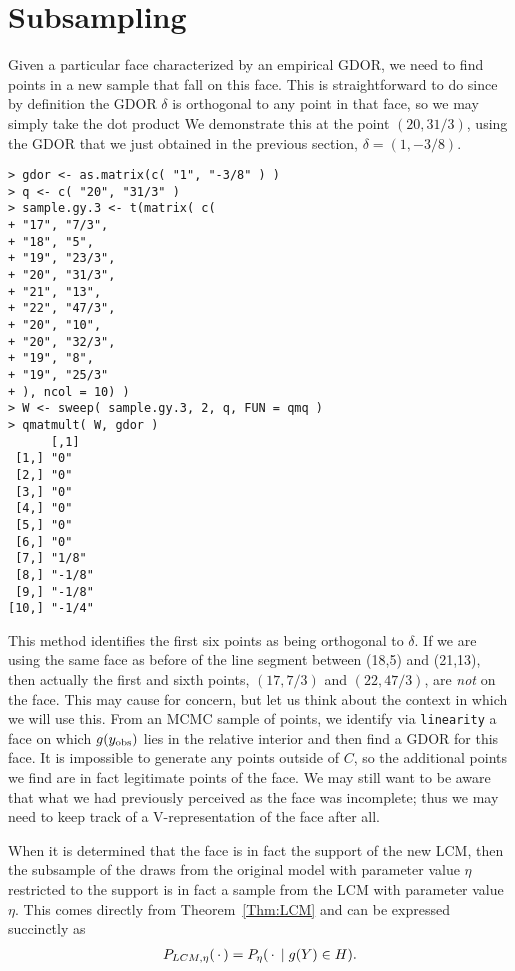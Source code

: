 \section{Subsampling}
Given a particular face characterized by an empirical GDOR, we need to
find points in a new sample that fall on this face.  This is straightforward to
do since by definition the GDOR $\delta$ is orthogonal to any point in that face,
so we may simply take the dot product 
We demonstrate this at the point $(20, 31/3)$, using the GDOR that we just 
obtained in the previous section, $\delta = (1, -3/8)$.
\begin{verbatim}
> gdor <- as.matrix(c( "1", "-3/8" ) )
> q <- c( "20", "31/3" )
> sample.gy.3 <- t(matrix( c(
+ "17", "7/3",
+ "18", "5",
+ "19", "23/3",
+ "20", "31/3",
+ "21", "13",
+ "22", "47/3",
+ "20", "10",
+ "20", "32/3",
+ "19", "8",
+ "19", "25/3"
+ ), ncol = 10) )
> W <- sweep( sample.gy.3, 2, q, FUN = qmq )
> qmatmult( W, gdor )
      [,1]  
 [1,] "0"   
 [2,] "0"   
 [3,] "0"   
 [4,] "0"   
 [5,] "0"   
 [6,] "0"   
 [7,] "1/8" 
 [8,] "-1/8"
 [9,] "-1/8"
[10,] "-1/4"
\end{verbatim}
This method identifies the first six points as being orthogonal to $\delta$.
If we are using the same face as before of the line segment between (18,5) and (21,13), 
then actually the first and sixth points, $(17, 7/3)$ and $(22,47/3)$, 
are \emph{not} on the face.  This may cause for concern, but let us 
think about the context in which we will use this.  From an MCMC sample of points,
we identify via \texttt{linearity} a face on which $g(y_{\text{obs}})$ lies in the relative
interior and then find a GDOR for this face.  It is impossible to generate any
points outside of $C$, so the additional points we find are in fact legitimate 
points of the face.  We may still want to be aware that what we had previously
perceived as the face was incomplete; thus we may need to keep track of a 
V-representation of the face after all.

When it is determined that the face is in fact the support of the new LCM,
then the subsample of the draws from the original model with parameter value $\eta$ 
restricted to the support is in fact a sample from the LCM with 
parameter value $\eta$.  This comes directly from Theorem~\ref{Thm:LCM} and can be
expressed succinctly as
\begin{align*}
P_{LCM, \eta}(\,\cdot\,) = P_\eta( \,\cdot\, \mid g(Y) \in H ).
\end{align*}


